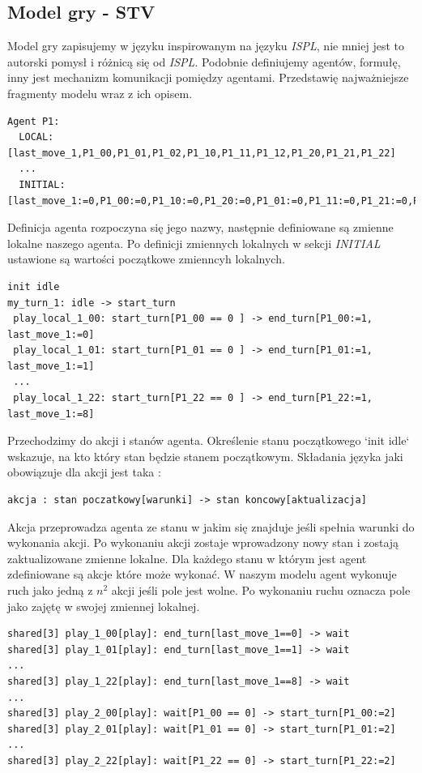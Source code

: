 \subsection*{Model gry - STV}
Model gry zapisujemy w języku inspirowanym na języku \textit{ISPL}, nie mniej jest to 
autorski pomysł i różnicą się od \textit{ISPL}. Podobnie definiujemy agentów, formułę, 
inny jest mechanizm komunikacji pomiędzy agentami. Przedstawię najważniejsze fragmenty modelu 
wraz z ich opisem.

\begin{lstlisting}[language={}]
  Agent P1:
  LOCAL: [last_move_1,P1_00,P1_01,P1_02,P1_10,P1_11,P1_12,P1_20,P1_21,P1_22]
  ...
  INITIAL: [last_move_1:=0,P1_00:=0,P1_10:=0,P1_20:=0,P1_01:=0,P1_11:=0,P1_21:=0,P1_02:=0,P1_12:=0,P1_22:=0]
\end{lstlisting}
Definicja agenta rozpoczyna się jego nazwy, następnie definiowane są zmienne lokalne naszego 
agenta. Po definicji zmiennych lokalnych w sekcji \textit{INITIAL} ustawione są wartości 
początkowe zmienncyh lokalnych.
\begin{lstlisting}[language={}]
init idle
my_turn_1: idle -> start_turn
 play_local_1_00: start_turn[P1_00 == 0 ] -> end_turn[P1_00:=1, last_move_1:=0]
 play_local_1_01: start_turn[P1_01 == 0 ] -> end_turn[P1_01:=1, last_move_1:=1]
 ... 
 play_local_1_22: start_turn[P1_22 == 0 ] -> end_turn[P1_22:=1, last_move_1:=8]
\end{lstlisting}
Przechodzimy do akcji i stanów agenta. Określenie stanu początkowego `init idle` wskazuje,
na kto który stan będzie stanem początkowym. Składania języka jaki obowiązuje dla akcji 
jest taka :
\begin{lstlisting}[language={}]
akcja : stan poczatkowy[warunki] -> stan koncowy[aktualizacja]
\end{lstlisting}
Akcja przeprowadza agenta ze stanu w jakim się znajduje jeśli spełnia warunki 
do wykonania akcji. Po wykonaniu akcji zostaje wprowadzony nowy stan i zostają 
zaktualizowane zmienne lokalne. Dla każdego stanu w którym jest agent zdefiniowane 
są akcje które może wykonać. W naszym modelu agent wykonuje ruch jako jedną z $n^{2}$
akcji jeśli pole jest wolne. Po wykonaniu ruchu oznacza pole jako zajętę w swojej zmiennej
lokalnej.
\begin{lstlisting}[language={}]
shared[3] play_1_00[play]: end_turn[last_move_1==0] -> wait
shared[3] play_1_01[play]: end_turn[last_move_1==1] -> wait
...
shared[3] play_1_22[play]: end_turn[last_move_1==8] -> wait
... 
shared[3] play_2_00[play]: wait[P1_00 == 0] -> start_turn[P1_00:=2]
shared[3] play_2_01[play]: wait[P1_01 == 0] -> start_turn[P1_01:=2]
...
shared[3] play_2_22[play]: wait[P1_22 == 0] -> start_turn[P1_22:=2]
\end{lstlisting}
